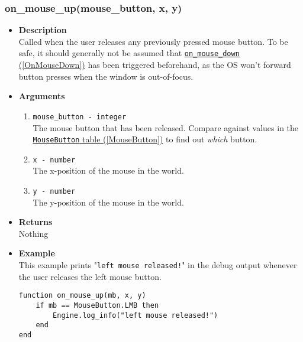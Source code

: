 \documentclass[12pt,a4paper]{article}
\begin{document}
\subsubsection{on\_mouse\_up(mouse\_button, x, y)}\label{OnMouseUp}
\begin{itemize}
	\item[]{\bf Description}
		\\ Called when the user releases any previously pressed mouse button. To be safe, it should generally not be assumed that \hyperref[OnMouseDown]{\texttt{on\_mouse\_down} (\ref{OnMouseDown})} has been triggered beforehand, as the OS won't forward button presses when the window is out-of-focus.
	\item[]{\bf Arguments}
		\begin{enumerate}
			\item{\texttt{mouse\_button - integer}} 
				\\ The mouse button that has been released. Compare against values in the \hyperref[MouseButton]{\texttt{MouseButton} table (\ref{MouseButton})} to find out \textit{which} button.
			\item{\texttt{x - number}}
				\\ The x-position of the mouse in the world.
			\item{\texttt{y - number}}
				\\ The y-position of the mouse in the world.
		\end{enumerate}
	\item[]{\bf Returns}
		\\ Nothing
	\item[]{\bf Example}
	\\ This example prints "\texttt{left mouse released!}" in the debug output whenever the user releases the left mouse button.
\begin{lstlisting}[language={[5.0]Lua}]
function on_mouse_up(mb, x, y)
    if mb == MouseButton.LMB then
        Engine.log_info("left mouse released!")
    end
end
\end{lstlisting}
\end{itemize}
\end{document}
